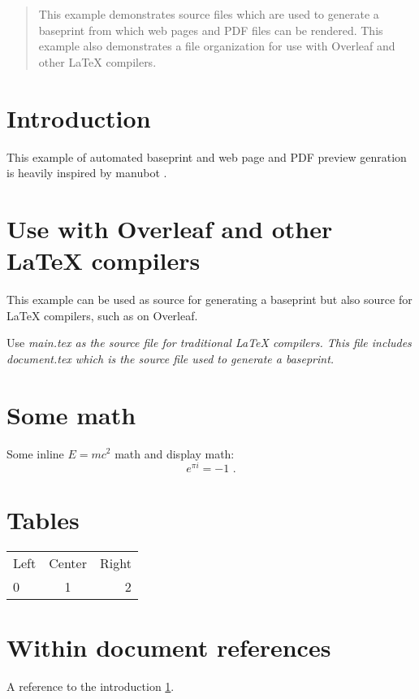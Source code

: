 

\newcommand{\mathstop}{\text{\ .}}



\begin{abstract}
This example demonstrates source files which are used to generate a baseprint from which
web pages and PDF files can be rendered.
This example also demonstrates a file organization for use with Overleaf and other LaTeX
compilers.
\end{abstract}

\section{Introduction}

\label{intro}

This example of automated baseprint and web page and PDF preview genration is heavily
inspired by manubot \cite{himmelstein_open_2019}.

\section{Use with Overleaf and other LaTeX compilers}

This example can be used as source for generating a baseprint but also source for
LaTeX compilers, such as on Overleaf.

Use \it{main.tex} as the source file for traditional LaTeX compilers.
This file includes \it{document.tex} which is the source file used to generate a
baseprint.

\section{Some math}

Some inline $E = mc^2$ math and display math:
\[
e^{\pi i} = -1
\mathstop
\]

\section{Tables}

\begin{tabular}{l c r}
 Left & Center & Right \\
  0   &    1   &   2
\end{tabular}

\section{Within document references}

A reference to the introduction \ref{intro}.


\printbibliography %

